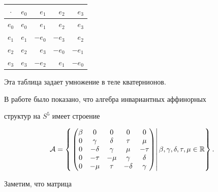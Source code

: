 \begin{pf}
{\hfill


\begin{tabular}{c|rrrr} 


$\cdot$ & $e_0$ & $e_1$ & $e_2$ & $e_3$\\ 


\hline 


$e_0$ & $e_0$ & $e_1$ & $e_2$ & $e_3$ \\ 


$e_1$ & $e_1$ & $-e_0$ & $-e_3$ & $e_2$ \\ 


$e_2$ & $e_2$ & $e_3$ & $-e_0$ & $-e_1$ \\ 


$e_3$ & $e_3$ & $-e_2$ & $e_1$ & $-e_0$ 


\end{tabular} 


\hfill}





\noindent Эта таблица задает умножение в теле кватернионов. 


 


В работе \cite{Lip} было показано, что алгебра инвариантных аффинорных 


структур на $S^5$ имеет строение 


\begin{equation} 


\cal A=\left\{\left. 


\begin{pmatrix} 


\beta & 0 & 0 & 0 & 0\\ 


0 & \gamma & \delta & \tau & \mu\\ 


0 & -\delta & \gamma & \mu & -\tau\\ 


0 & -\tau & -\mu & \gamma & \delta\\ 


0 & -\mu & \tau & -\delta & \gamma 


\end{pmatrix} 


\right| 


\beta,\gamma,\delta,\tau,\mu\in\Bbb R\right\}. 


\end{equation} 


Заметим, что матрица 



\end{pf}
